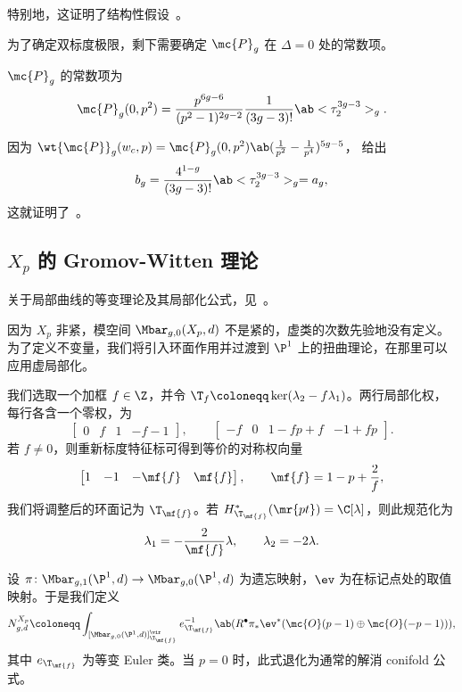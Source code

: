 特别地，这证明了结构性假设~。

为了确定双标度极限，剩下需要确定 \(\mc{P}_g\) 在 \(\Delta = 0\) 处的常数项。

\begin{thm}%
\label{thm:local P1 constant term}
    \(\mc{P}_g\) 的常数项为
    \[ \mc{P}_g(0,p^2) = \frac{p^{6g-6}}{(p^2-1)^{2g-2}}\frac{1}{(3g-3)!}\ab<\tau_2^{3g-3}>_g. \]
\end{thm}

因为 \(\wt{\mc{P}}_g(w_c,p) = \mc{P}_g(0,p^2)\ab(\frac{1}{p^2}-\frac{1}{p^4})^{5g-5}\)， 给出
\[ b_g = \frac{4^{1-g}}{(3g-3)!}\ab<\tau_2^{3g-3}>_g = a_g, \]
这就证明了~。

\subsection{\(X_p\) 的 Gromov-Witten 理论}%
\label{sub:Gromov-Witten theory of Xp}

关于局部曲线的等变理论及其局部化公式，见~\cite{BryanPandharipande2008}。

因为 \(X_p\) 非紧，模空间 \(\Mbar_{g,0}(X_p,d)\) 不是紧的，虚类的次数先验地没有定义。为了定义不变量，我们将引入环面作用并过渡到 \(\P^1\) 上的扭曲理论，在那里可以应用虚局部化。

我们选取一个加框 \(f \in \Z\)，并令 \(\T_f \coloneqq \ker(\lambda_2 - f\lambda_1)\)。两行局部化权，每行各含一个零权，为
\[ \begin{bmatrix} 0 & f & 1 & -f-1 \end{bmatrix}, \qquad \begin{bmatrix} -f & 0 & 1-fp+f & -1+fp \end{bmatrix}. \]
若 \(f \neq 0\)，则重新标度特征标可得到等价的对称权向量
\[ \begin{bmatrix} 1 & -1 & -\mf{f} & \mf{f} \end{bmatrix}, \qquad \mf{f} = 1-p+\frac{2}{f}, \]
我们将调整后的环面记为 \(\T_{\mf{f}}\)。若 \(H^*_{\T_{\mf{f}}}(\mr{pt}) = \C[\lambda]\)，则此规范化为
\[ \lambda_1 = -\frac{2}{\mf{f}}\lambda, \qquad \lambda_2 = -2\lambda. \]

设 \(\pi \colon \Mbar_{g,1}(\P^1,d) \to \Mbar_{g,0}(\P^1,d)\) 为遗忘映射，\(\ev\) 为在标记点处的取值映射。于是我们定义
\[ N^{X_p}_{g,d} \coloneqq \int_{[\Mbar_{g,0}(\P^1,d)]^{\vir}_{\T_{\mf{f}}}} e_{\T_{\mf{f}}}^{-1}\ab(R^{\bullet}\pi_* \ev^*(\mc{O}(p-1)\oplus\mc{O}(-p-1))), \]
其中 \(e_{\T_{\mf{f}}}\) 为等变 Euler 类。当 \(p=0\) 时，此式退化为通常的解消 conifold 公式。

